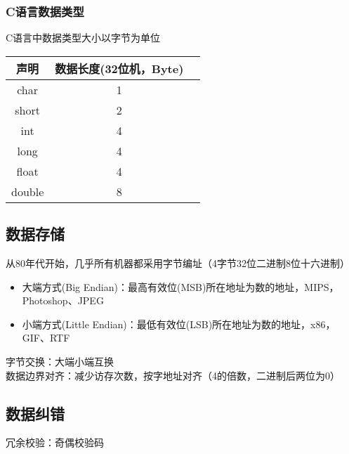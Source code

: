 \subsubsection{C语言数据类型}
C语言中数据类型大小以字节为单位
\begin{center}
\begin{tabular}{|c|c|c|}\hline
声明 & 数据长度(32位机，Byte)\\\hline
char & 1 \\\hline
short & 2 \\\hline
int & 4 \\\hline
long & 4 \\\hline
float & 4 \\\hline
double & 8 \\\hline
\end{tabular}
\end{center}


\subsection{数据存储}
从80年代开始，几乎所有机器都采用字节编址（4字节32位二进制8位十六进制）
\begin{itemize}
	\item 大端方式(Big Endian)：最高有效位(MSB)所在地址为数的地址，MIPS，Photoshop、JPEG
	\item 小端方式(Little Endian)：最低有效位(LSB)所在地址为数的地址，x86，GIF、RTF
\end{itemize}
字节交换：大端小端互换\\
数据边界对齐：减少访存次数，按字地址对齐（4的倍数，二进制后两位为0）


\subsection{数据纠错}
冗余校验：奇偶校验码


